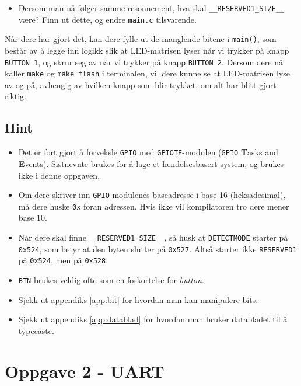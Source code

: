  \begin{itemize}
     \item Dersom man nå følger samme resonnement, hva skal \verb|__RESERVED1_SIZE__| være? Finn ut dette, og endre \verb|main.c| tilsvarende.
 \end{itemize}


Når dere har gjort det, kan dere fylle ut de manglende bitene i \verb|main()|, som består av å legge inn logikk slik at LED-matrisen lyser når vi trykker på knapp \verb|BUTTON 1|, og skrur seg av når vi trykker på knapp \verb|BUTTON 2|. Dersom dere nå kaller \verb|make| og \verb|make flash| i terminalen, vil dere kunne se at LED-matrisen lyse av og på, avhengig av hvilken knapp som blir trykket, om alt har blitt gjort riktig.


\subsection{Hint}\label{subsec:GPIO-hint}

\begin{itemize}
    \item Det er fort gjort å forveksle \verb|GPIO| med \verb|GPIOTE|-modulen (\verb|GPIO| \textbf{T}asks
and \textbf{E}vents). Sistnevnte brukes for å lage et hendelsesbasert system, og brukes ikke i denne oppgaven.
    \item Om dere skriver inn \verb|GPIO|-modulenes baseadresse i base 16 (heksadesimal), må dere huske \verb|0x| foran adressen. Hvis ikke vil kompilatoren
    tro dere mener base 10.
    \item Når dere skal finne \verb|__RESERVED1_SIZE__|, så husk at \verb|DETECTMODE| starter på \verb|0x524|, som betyr at den byten slutter på \verb|0x527|. Altså starter ikke \verb|RESERVED1| på \verb|0x524|, men på \verb|0x528|.
    \item \verb|BTN| brukes veldig ofte som en forkortelse for \textit{button}.
    \item Sjekk ut appendiks \ref{app:bit} for hvordan man kan manipulere bits.
    \item Sjekk ut appendiks \ref{app:datablad} for hvordan man bruker databladet til å typecaste.

\end{itemize}


\section{Oppgave 2 - UART}\label{sec:4-oppgave-UART}

